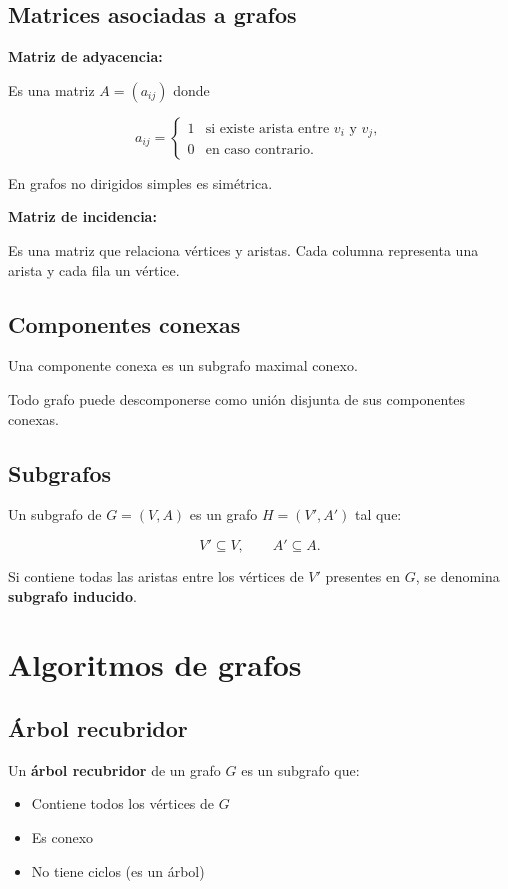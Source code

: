 \documentclass[12pt]{article}
\theoremstyle{plain}
\theoremstyle{definition}
\theoremstyle{remark}
\begin{document}
\subsection*{Matrices asociadas a grafos}

\textbf{Matriz de adyacencia:}

Es una matriz $A = (a_{ij})$ donde

\[
a_{ij} =
\begin{cases}
1 & \text{si existe arista entre } v_i \text{ y } v_j, \\
0 & \text{en caso contrario.}
\end{cases}
\]

En grafos no dirigidos simples es simétrica.

\textbf{Matriz de incidencia:}

Es una matriz que relaciona vértices y aristas.  
Cada columna representa una arista y cada fila un vértice.

\subsection*{Componentes conexas}

Una componente conexa es un subgrafo maximal conexo.

Todo grafo puede descomponerse como unión disjunta de sus componentes conexas.

\subsection*{Subgrafos}

Un subgrafo de $G=(V,A)$ es un grafo $H=(V',A')$ tal que:

\[
V' \subseteq V, \qquad A' \subseteq A.
\]

Si contiene todas las aristas entre los vértices de $V'$ presentes en $G$, se denomina \textbf{subgrafo inducido}.

\section*{Algoritmos de grafos}

\subsection*{Árbol recubridor}

Un \textbf{árbol recubridor} de un grafo $G$ es un subgrafo que:

\begin{itemize}
    \item Contiene todos los vértices de $G$
    \item Es conexo
    \item No tiene ciclos (es un árbol)
\end{itemize}
\end{document}
